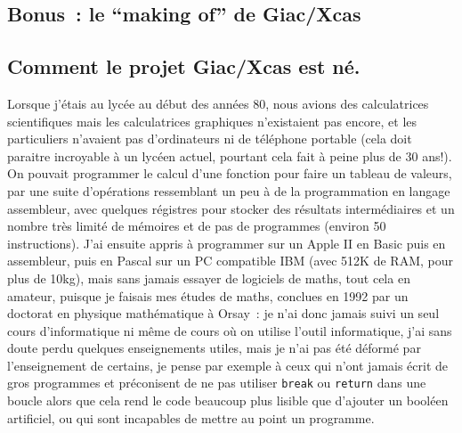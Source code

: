 \documentclass[a4paper,11pt]{article}
\begin{document}
\begin{giacjshere}

\pagebreak

\appendix

\section{Bonus~: le ``making of'' de Giac/Xcas}

\subsection{Comment le projet Giac/Xcas est n\'e.}
Lorsque j'\'etais au lyc\'ee au d\'ebut des ann\'ees 80,
nous avions des calculatrices
scientifiques mais les calculatrices graphiques n'existaient pas
encore, et les
particuliers n'avaient pas d'ordinateurs ni de t\'el\'ephone
portable (cela doit paraitre incroyable \`a un lyc\'een actuel,
pourtant cela fait \`a peine plus de 30 ans!). On pouvait
programmer le calcul d'une fonction pour faire un tableau
de valeurs, par une suite d'op\'erations ressemblant un peu
\`a de la programmation en langage assembleur,
avec quelques r\'egistres pour stocker des r\'esultats
interm\'ediaires et un nombre tr\`es
limit\'e de m\'emoires et de pas de programmes (environ
50 instructions).
J'ai ensuite appris \`a programmer sur un Apple II en Basic puis en
assembleur, puis en Pascal sur un PC compatible IBM (avec 512K de RAM,
pour plus de 10kg),
mais sans jamais essayer de logiciels de maths, tout cela
en amateur, puisque je faisais mes \'etudes de maths, conclues
en 1992 par un doctorat en physique math\'ematique \`a Orsay~:
je n'ai donc jamais suivi un seul cours d'informatique ni
m\^eme de cours o\`u
on utilise l'outil informatique, j'ai sans doute perdu quelques
enseignements utiles, mais je n'ai pas \'et\'e d\'eform\'e par
l'enseignement de certains, je pense par exemple
\`a ceux qui n'ont jamais \'ecrit de
gros programmes et pr\'econisent de ne pas
utiliser \verb|break| ou \verb|return| dans une boucle
alors que cela rend le code beaucoup plus lisible que
d'ajouter un bool\'een artificiel, ou qui
sont incapables de mettre au point un programme.


\end{giacjshere}
\end{document}
